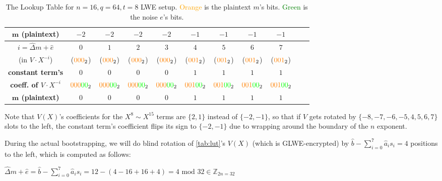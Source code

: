 \begin{enumerate}
\begin{table}[h]
\begin{tabular}{|c||c|c|c|c|c|c|c|c|c|c|}
\hline
\textbf{$\bm{m}$ (plaintext)} & $-2$ & $-2$ & $-2$ & $-2$ & $-1$ & $-1$ & $-1$ & $-1$ \\
\hline
\hline
\textbf{\boldmath$i = \hat{\Delta}m + \hat{e}$} & $0$ & $1$ & $2$ & $3$ & $4$ & $5$ & $6$ & $7$ \\
(in $V \cdot X^{-i}$) & ($\textcolor{cyan}{}\textcolor{orange}{000}_2$)& ($\textcolor{cyan}{}\textcolor{orange}{000}_2$)& ($\textcolor{cyan}{}\textcolor{orange}{000}_2$)& ($\textcolor{cyan}{}\textcolor{orange}{000}_2$)& ($\textcolor{cyan}{}\textcolor{orange}{001}_2$)& ($\textcolor{cyan}{}\textcolor{orange}{001}_2$)& ($\textcolor{cyan}{}\textcolor{orange}{001}_2$)&($\textcolor{cyan}{}\textcolor{orange}{001}_2$)\\
\hline
\textbf{constant term's} & $0$ & $0$ & $0$ & $0$ & $1$ & $1$ & $1$ & $1$ \\
\textbf{coeff. of $V\cdot X^{-i}$}& $\textcolor{orange}{000}\textcolor{green}{00}_2$ & $\textcolor{orange}{000}\textcolor{green}{00}_2$ & $\textcolor{orange}{000}\textcolor{green}{00}_2$ & $\textcolor{orange}{000}\textcolor{green}{00}_2$ & $\textcolor{orange}{001}\textcolor{green}{00}_2$ & $\textcolor{orange}{001}\textcolor{green}{00}_2$ & $\textcolor{orange}{001}\textcolor{green}{00}_2$ & $\textcolor{orange}{001}\textcolor{green}{00}_2$ \\
\hline
\textbf{$\bm{m}$ (plaintext)} & $0$ & $0$ & $0$ & $0$ & $1$ & $1$ & $1$ & $1$ \\
\hline
\end{tabular}
\centering
\caption{The Lookup Table for $n=16, q=64, t=8$ LWE setup.
\textcolor{orange}{Orange} is the plaintext $m$'s bits. \textcolor{green}{Green} is the noise $e$'s bits. %
}
\label{tab:lut}
\end{table}

Note that $V(X)$'s coefficients for the $X^8 \sim X^{15}$ terms are $\{2, 1\}$ instead of $\{-2, -1\}$, so that if $V$ gets rotated by $\{-8,-7,-6,-5,4,5,6,7\}$ slots to the left, the constant term's coefficient flips its sign to $\{-2, -1\}$ due to wrapping around the boundary of the $n$ exponent. 

During the actual bootstrapping, we will do blind rotation of \autoref{tab:lut}'s $V(X)$ (which is GLWE-encrypted) by $\hat{b} - \sum\limits_{i=0}^{7}\hat{a}_is_i = 4$ positions to the left, which is computed as follows:

$\hat\Delta m + \hat e = \hat{b} - \sum\limits_{i=0}^{7}\hat{a}_is_i = 12 - (4 - 16 + 16 + 4) = 4 \text{ mod 32} \in \mathbb{Z}_{2n=32}$ 



\end{enumerate}
